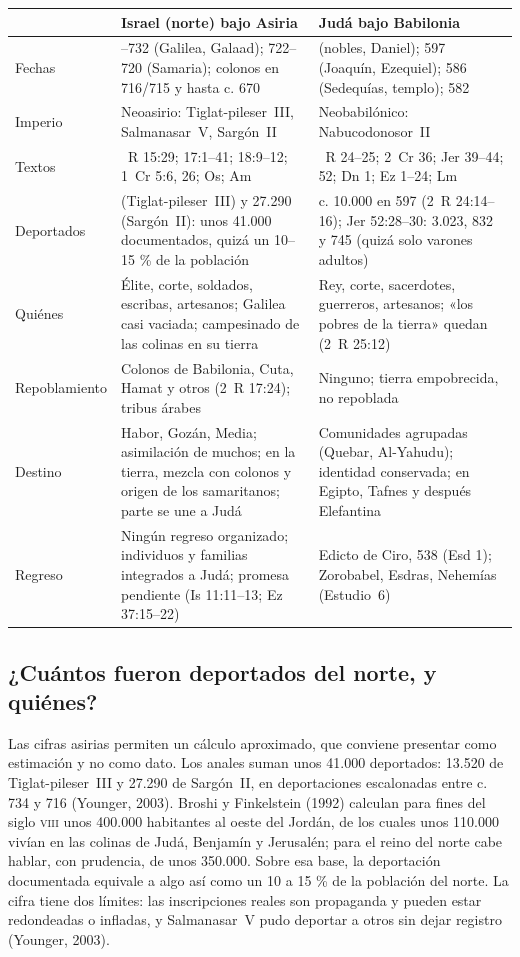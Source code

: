 \documentclass[11pt,letterpaper]{article}
\begin{document}
\begin{table}[!htbp]\centering\footnotesize
\renewcommand{\arraystretch}{1.12}
\begin{tabular}{>{\RaggedRight\arraybackslash}p{2.3cm}>{\RaggedRight\arraybackslash}p{6.0cm}>{\RaggedRight\arraybackslash}p{6.0cm}}
\toprule
& \textbf{Israel (norte) bajo Asiria} & \textbf{Judá bajo Babilonia}\\
\midrule
Fechas & 733--732 (Galilea, Galaad); 722--720 (Samaria); colonos en 716/715 y hasta c. 670 & 605 (nobles, Daniel); 597 (Joaquín, Ezequiel); 586 (Sedequías, templo); 582\\
Imperio & Neoasirio: Tiglat-pileser~III, Salmanasar~V, Sargón~II & Neobabilónico: Nabucodonosor~II\\
Textos & 2~R 15:29; 17:1--41; 18:9--12; 1~Cr 5:6, 26; Os; Am & 2~R 24--25; 2~Cr 36; Jer 39--44; 52; Dn 1; Ez 1--24; Lm\\
Deportados & 13.520 (Tiglat-pileser~III) y 27.290 (Sargón~II): unos 41.000 documentados, quizá un 10--15 \% de la población & c. 10.000 en 597 (2~R 24:14--16); Jer 52:28--30: 3.023, 832 y 745 (quizá solo varones adultos)\\
Quiénes & Élite, corte, soldados, escribas, artesanos; Galilea casi vaciada; campesinado de las colinas en su tierra & Rey, corte, sacerdotes, guerreros, artesanos; «los pobres de la tierra» quedan (2~R 25:12)\\
Repoblamiento & Colonos de Babilonia, Cuta, Hamat y otros (2~R 17:24); tribus árabes & Ninguno; tierra empobrecida, no repoblada\\
Destino & Habor, Gozán, Media; asimilación de muchos; en la tierra, mezcla con colonos y origen de los samaritanos; parte se une a Judá & Comunidades agrupadas (Quebar, Al-Yahudu); identidad conservada; en Egipto, Tafnes y después Elefantina\\
Regreso & Ningún regreso organizado; individuos y familias integrados a Judá; promesa pendiente (Is 11:11--13; Ez 37:15--22) & Edicto de Ciro, 538 (Esd 1); Zorobabel, Esdras, Nehemías (Estudio~6)\\
\bottomrule
\end{tabular}\end{table}

\subsection{¿Cuántos fueron deportados del norte, y quiénes?}
Las cifras asirias permiten un cálculo aproximado, que conviene presentar como estimación y no como dato. Los anales suman unos 41.000 deportados: 13.520 de Tiglat-pileser~III y 27.290 de Sargón~II, en deportaciones escalonadas entre c. 734 y 716 (Younger, 2003). Broshi y Finkelstein (1992) calculan para fines del siglo \textsc{viii} unos 400.000 habitantes al oeste del Jordán, de los cuales unos 110.000 vivían en las colinas de Judá, Benjamín y Jerusalén; para el reino del norte cabe hablar, con prudencia, de unos 350.000. Sobre esa base, la deportación documentada equivale a algo así como un 10 a 15 \% de la población del norte. La cifra tiene dos límites: las inscripciones reales son propaganda y pueden estar redondeadas o infladas, y Salmanasar~V pudo deportar a otros sin dejar registro (Younger, 2003).
\end{document}
